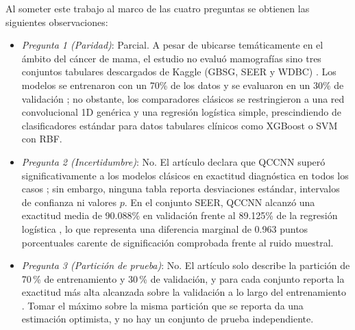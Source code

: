 Al someter este trabajo al marco de las cuatro preguntas se obtienen las siguientes observaciones:
\begin{itemize}
  \item \textit{Pregunta 1 (Paridad)}: Parcial. 
A pesar de ubicarse temáticamente en el ámbito del cáncer de mama, el estudio no evaluó mamografías sino tres conjuntos tabulares descargados de Kaggle (GBSG, SEER y WDBC) \cite{Xiang2024QuantumCNN}.
Los modelos se entrenaron con un 70\% de los datos y se evaluaron en un 30\% de validación \cite{Xiang2024QuantumCNN}; no obstante, los comparadores clásicos se restringieron a una red convolucional 1D genérica y una regresión logística simple, prescindiendo de clasificadores estándar para datos tabulares clínicos como XGBoost o SVM con RBF.
  \item \textit{Pregunta 2 (Incertidumbre)}: No. 
El artículo declara que QCCNN superó significativamente a los modelos clásicos en exactitud diagnóstica en todos los casos \cite{Xiang2024QuantumCNN}; sin embargo, ninguna tabla reporta desviaciones estándar, intervalos de confianza ni valores $p$.
En el conjunto SEER, QCCNN alcanzó una exactitud media de 90.088\% en validación frente al 89.125\% de la regresión logística \cite{Xiang2024QuantumCNN}, lo que representa una diferencia marginal de 0.963 puntos porcentuales carente de significación comprobada frente al ruido muestral.
  \item \textit{Pregunta 3 (Partición de prueba)}: No. El artículo solo describe la partición de 70\,\% de entrenamiento y 30\,\% de validación, y para cada conjunto reporta la exactitud más alta alcanzada sobre la validación a lo largo del entrenamiento \cite{Xiang2024QuantumCNN}. Tomar el máximo sobre la misma partición que se reporta da una estimación optimista, y no hay un conjunto de prueba independiente.

\end{itemize}
